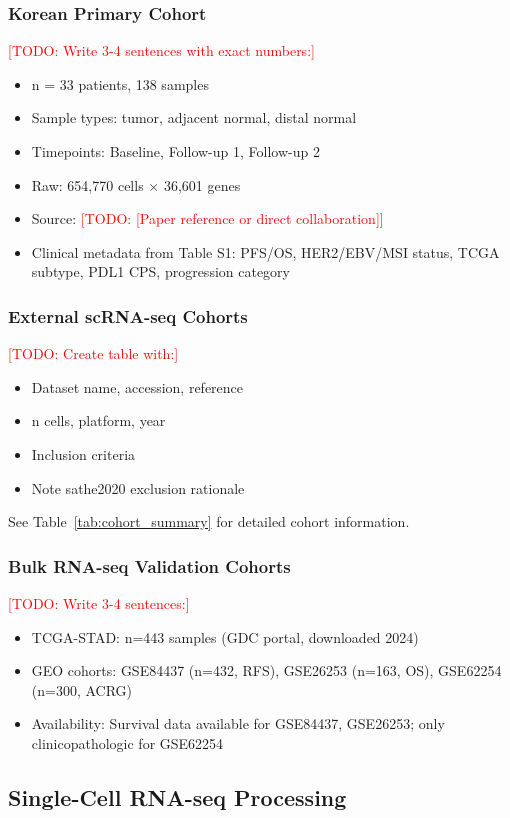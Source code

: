 \documentclass[12pt,oneside]{article}
\newcommand{\TODO}[1]{\textcolor{red}{[TODO: #1]}}
\newcommand{\TAB}[1]{Table~\ref{tab:#1}}
\begin{document}
\subsubsection{Korean Primary Cohort}
\TODO{Write 3-4 sentences with exact numbers:}
\begin{itemize}
    \item n = 33 patients, 138 samples
    \item Sample types: tumor, adjacent normal, distal normal
    \item Timepoints: Baseline, Follow-up 1, Follow-up 2
    \item Raw: 654,770 cells $\times$ 36,601 genes
    \item Source: \TODO{[Paper reference or direct collaboration]}
    \item Clinical metadata from Table S1: PFS/OS, HER2/EBV/MSI status, TCGA subtype, PDL1 CPS, progression category
\end{itemize}

\subsubsection{External scRNA-seq Cohorts}
\TODO{Create table with:}
\begin{itemize}
    \item Dataset name, accession, reference
    \item n cells, platform, year
    \item Inclusion criteria
    \item Note sathe2020 exclusion rationale
\end{itemize}

See \TAB{cohort_summary} for detailed cohort information.

\subsubsection{Bulk RNA-seq Validation Cohorts}
\TODO{Write 3-4 sentences:}
\begin{itemize}
    \item TCGA-STAD: n=443 samples (GDC portal, downloaded 2024)
    \item GEO cohorts: GSE84437 (n=432, RFS), GSE26253 (n=163, OS), GSE62254 (n=300, ACRG)
    \item Availability: Survival data available for GSE84437, GSE26253; only clinicopathologic for GSE62254
\end{itemize}

\subsection{Single-Cell RNA-seq Processing}
\end{document}
